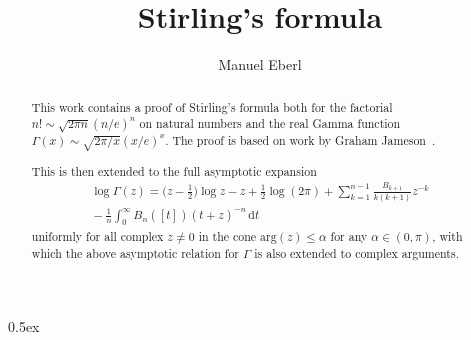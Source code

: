 \documentclass[11pt,a4paper]{article}
\begin{document}
\title{Stirling's formula}
\author{Manuel Eberl}
\maketitle

\begin{abstract}
This work contains a proof of Stirling's formula both for the factorial $n! \sim \sqrt{2\pi n} (n/e)^n$ on natural numbers and the real Gamma function $\Gamma(x)\sim \sqrt{2\pi/x} (x/e)^x$. The proof is based on work by Graham Jameson~\cite{jameson}.

This is then extended to the full asymptotic expansion
\begin{multline*}
\log\Gamma(z) = \big(z - \tfrac{1}{2}\big)\log z - z + \tfrac{1}{2}\log(2\pi) + \sum_{k=1}^{n-1} \frac{B_{k+1}}{k(k+1)} z^{-k}\\
{} - \frac{1}{n} \int_0^\infty B_n([t])(t + z)^{-n}\,\text{d}t
\end{multline*}
uniformly for all complex $z\neq 0$ in the cone $\text{arg}(z)\leq \alpha$ for any $\alpha\in(0,\pi)$, with which the above asymptotic relation for $\Gamma$ is also extended to complex arguments.
\end{abstract}

\tableofcontents

\parindent 0pt\parskip 0.5ex



\nocite{*}


\end{document}

